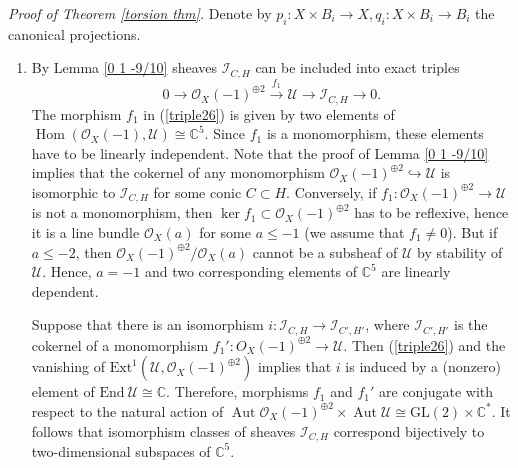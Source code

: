 \documentclass{amsart}
\DeclareMathOperator{\Hom}{Hom}
\DeclareMathOperator{\Aut}{Aut}
\begin{document}
\textit{Proof of Theorem \ref{torsion thm}.}
Denote by $p_i:X\times B_i\to X,q_i:X\times B_i\to B_i$ the canonical projections.

\begin{enumerate}
\item  
By Lemma \ref{0 1 -9/10} sheaves $\mathcal I_{C,H}$ can be included into exact triples
\begin{equation}\label{triple26}0\to\mathcal O_X(-1)^{\oplus 2}\overset{f_1}{\to}\mathcal U\to \mathcal I_{C,H}\to 0.\end{equation}
The morphism $f_1$ in (\ref{triple26}) is given by two elements of $\Hom(\mathcal O_X(-1),\mathcal U)\cong\mathbb C^5$. Since $f_1$ is a monomorphism, these elements have to be linearly independent. Note that the proof of Lemma \ref{0 1 -9/10} implies that the cokernel of any monomorphism $\mathcal O_X(-1)^{\oplus 2}\hookrightarrow \mathcal U$ is isomorphic to $\mathcal I_{C,H}$ for some conic $C\subset H$. Conversely, if $f_1:\mathcal O_X(-1)^{\oplus 2}\to\mathcal U$ is not a monomorphism, then $\ker f_1\subset\mathcal O_X(-1)^{\oplus 2}$ has to be reflexive, hence it is a line bundle $\mathcal O_X(a)$ for some $a\le -1$ (we assume that $f_1\neq 0$). But if $a\le -2$, then $\mathcal O_X(-1)^{\oplus 2}/\mathcal O_X(a)$ cannot be a subsheaf of $\mathcal U$ by stability of $\mathcal U$. Hence, $a=-1$ and two corresponding elements of $\mathbb C^5$ are linearly dependent.

Suppose that there is an isomorphism $i:\mathcal I_{C,H}\to\mathcal I_{C',H'}$, where $\mathcal I_{C',H'}$ is the cokernel of a monomorphism $f_1':O_X(-1)^{\oplus 2}\to\mathcal U$. Then (\ref{triple26}) and the vanishing of $\mathrm{Ext}^1(\mathcal U,\mathcal O_X(-1)^{\oplus 2})$ implies that $i$ is induced by a (nonzero) element of $\mathrm{End}\ \mathcal U\cong\mathbb C$. Therefore, morphisms $f_1$ and $f_1'$ are conjugate with respect to the natural action of $\Aut \mathcal O_X(-1)^{\oplus 2}\times\Aut \mathcal U\cong\mathrm{GL}(2)\times\mathbb C^*$. It follows that isomorphism classes of sheaves $\mathcal I_{C,H}$ correspond bijectively to two-dimensional subspaces of $\mathbb C^5$. 


\end{enumerate}
\end{document}
